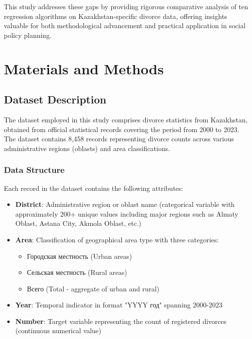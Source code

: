 This study addresses these gaps by providing rigorous comparative analysis of ten regression algorithms on Kazakhstan-specific divorce data, offering insights valuable for both methodological advancement and practical application in social policy planning.

\chapter{Materials and Methods}
\label{chap:methods}
\setlength{\parskip}{1em}

\section{Dataset Description}

The dataset employed in this study comprises divorce statistics from Kazakhstan, obtained from official statistical records covering the period from 2000 to 2023. The dataset contains 8,458 records representing divorce counts across various administrative regions (oblasts) and area classifications.

\subsection{Data Structure}

Each record in the dataset contains the following attributes:

\begin{itemize}
    \item \textbf{District}: Administrative region or oblast name (categorical variable with approximately 200+ unique values including major regions such as Almaty Oblast, Astana City, Akmola Oblast, etc.)
    \item \textbf{Area}: Classification of geographical area type with three categories:
    \begin{itemize}
        \item Городская местность (Urban areas)
        \item Сельская местность (Rural areas)  
        \item Всего (Total - aggregate of urban and rural)
    \end{itemize}
    \item \textbf{Year}: Temporal indicator in format "YYYY год" spanning 2000-2023
    \item \textbf{Number}: Target variable representing the count of registered divorces (continuous numerical value)
\end{itemize}

